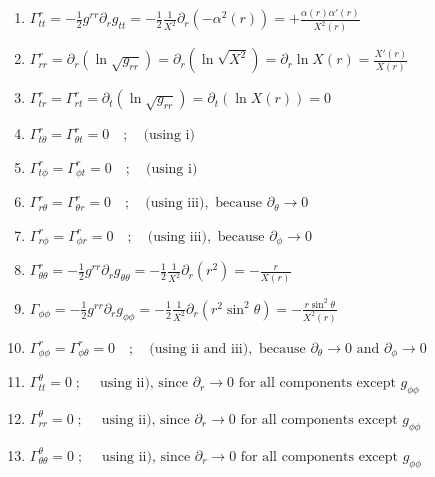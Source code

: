 \documentclass[12pt]{report}
\begin{document}
\begin{enumerate}
		\item $\Gamma^r_{tt} = -\frac{1}{2}g^{rr}\partial_r g_{tt} = -\frac{1}{2}\frac{1}{X^2}\partial_r(-\alpha^2(r)) = +\frac{\alpha(r)\alpha'(r)}{X^2(r)}$
		
		\item $\Gamma^r_{rr} = \partial_r(\ln\sqrt{g_{rr}}) = \partial_r(\ln\sqrt{X^2}) = \partial_r\ln X(r) = \frac{X'(r)}{X(r)}$
		
		\item $\Gamma^r_{tr} = \Gamma^r_{rt} = \partial_t(\ln\sqrt{g_{rr}}) = \partial_t(\ln X(r)) = 0$
		
		\item $\Gamma^r_{t\theta} = \Gamma^r_{\theta t} = 0 \quad ; \quad \text{(using i)}$
		
		\item $\Gamma^r_{t\phi} = \Gamma^r_{\phi t} = 0 \quad ; \quad\text{(using i)}$
		
		\item $\Gamma^r_{r\theta} = \Gamma^r_{\theta r} = 0 \quad ; \quad \text{(using iii)}, \text{ because } \partial_\theta \to 0$
		
		\item $\Gamma^r_{r\phi} = \Gamma^r_{\phi r} = 0 \quad;\quad \text{(using iii)}, \text{ because } \partial_\phi \to 0$
		
		\item $\Gamma^r_{\theta\theta} = -\frac{1}{2}g^{rr}\partial_r g_{\theta\theta} = -\frac{1}{2}\frac{1}{X^2}\partial_r(r^2) = -\frac{r}{X(r)}$
		
		\item $\Gamma_{\phi\phi} = -\frac{1}{2} g^{rr} \partial_r g_{\phi\phi} = -\frac{1}{2} \frac{1}{X^2} \partial_r (r^2\sin^2\theta) = -\frac{r\sin^2\theta}{X^2(r)}$ 
		
		\item $\Gamma^r_{\phi\phi} = \Gamma^r_{\phi\theta} = 0\quad;\quad \text{(using ii and iii)}, \text{ because } \partial_\theta \to 0 \text{ and }\partial_\phi \to 0$ 
		
		\item  $\Gamma^{\theta}_{tt} = 0 \; ; \; \quad \text{using ii), since } \partial_r \to 0 \text{ for all components except } g_{\phi\phi}$ 
		
		\item $\Gamma^{\theta}_{rr} = 0 \; ; \; \quad \text{using ii), since } \partial_r \to 0 \text{ for all components except } g_{\phi\phi} $
		
		\item $\Gamma^{\theta}_{\theta\theta} = 0\; ; \; \quad \text{using ii), since } \partial_r \to 0 \text{ for all components except } g_{\phi\phi}$
		

\end{enumerate}
\end{document}
